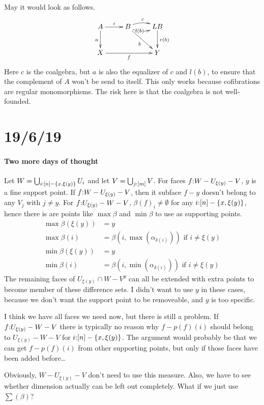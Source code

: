 \documentclass[csh.tex]{subfiles}
\begin{document}
May it would look as follows.
\[\xymatrix{
  A\ar[r]^i\ar[d]_a & B\ar@/^/[r]^{c}\ar@/_/[r]|(.4){l(b)}\ar[dr]_{b} & LB\ar[d]^{r(b)}\\
  X\ar[rr]_f && Y
}\]
Here $c$ is the coalgebra, but $a$ is also the equalizer of $c$ and $l(b)$, to 
ensure that the complement of $A$ won't be send to itself. This only works 
because cofibrations are regular monomorphisms. The risk here is that the 
coalgebra is not well-founded.

\section{19/6/19}

\paragraph{Two more days of thought}
Let $W = \bigcup_{i\mathord : [n]-\left\{x,\xi(y)\right\}} U_i$ and let
$V=\bigcup_{j\mathord :[m]}V$.
For faces $f\mathord : W-U_{\xi(y)}-V$, $y$ is a
fine support point. If $f\mathord : W-U_{\xi(y)}-V$, then it subface
$f-y$ doesn't belong to any $V_j$ with $j\neq y$.
For $f\mathord : U_{\xi(y)}-W-V$, $\beta(f)_i\neq \emptyset$ for any 
$i\mathord : [n]-\left\{x,\xi(y)\right\}$, hence there is are points like $\max\beta$ and
$\min\beta$ to use as supporting points.
\begin{align*}
  \max\beta(\xi(y)) &=y\\
  \max\beta(i) &= \beta(i,\max(\alpha_{\delta(i)})) \textrm{ if } i\neq \xi(y)\\
  \min\beta(\xi(y)) &=y\\
  \min\beta(i) &= \beta(i,\min(\alpha_{\delta(i)})) \textrm{ if } i\neq \xi(y)
\end{align*}
The remaining faces of $U_{\xi(y)}\cap W-V^y$ can all be extended with extra 
points to become member of these difference sets. I didn't want to use $y$ in 
these cases, because we don't want the support point to be removeable, and
$y$ is too specific.

I think we have all faces we need now, but there is still a problem.
If $f\mathord : U_{\xi(y)}-W-V$ there is typically no reason why $f-p(f)(i)$ 
should belong to $U_{\xi(y)}-W-V$ for $i\mathord : [n]-\left\{x,\xi(y)\right\}$. The argument
would probably be that we can get $f-p(f)(i)$ from other supporting points,
but only if those faces have been added before\dots

Obviously, $W-U_{\xi(y)}-V$ don't need to use this measure. Also, we have to see
whether dimension actually can be left out completely.
What if we just use $\sum(\beta)$?
\end{document}
